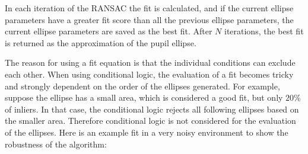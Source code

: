 In each iteration of the RANSAC the fit is calculated, and if the current ellipse parameters have a greater fit score than all the previous ellipse parameters, the current ellipse parameters are saved as the best fit. After $N$ iterations, the best fit is returned as the approximation of the pupil ellipse. 

The reason for using a fit equation is that the individual conditions can exclude each other. When using conditional logic, the evaluation of a fit becomes tricky and strongly dependent on the order of the ellipses generated. For example, suppose the ellipse has a small area, which is considered a good fit, but only $20\%$ of inliers. In that case, the conditional logic rejects all following ellipses based on the smaller area. Therefore conditional logic is not considered for the evaluation of the ellipses. 
Here is an example fit in a very noisy environment to show the robustness of the algorithm: 

